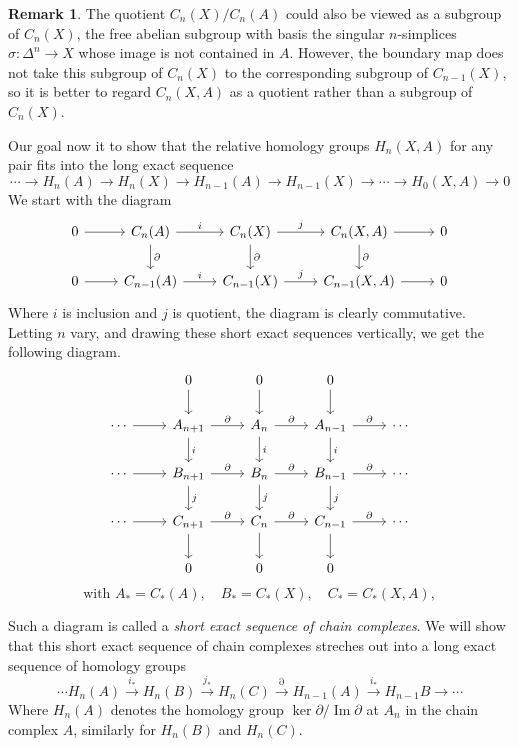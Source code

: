 \documentclass[11pt,a4paper]{article}
\theoremstyle{definition}
\newtheorem{remark}[definition]{Remark}
\theoremstyle{plain}
\theoremstyle{remark}
\begin{document}
\begin{remark}
The quotient $C_n(X) / C_n(A)$ could also be viewed as a subgroup of $C_n(X)$, the free abelian subgroup with 
basis the singular $n$-simplices $\sigma \colon \Delta^n \to X$ whose image is not contained in $A$. 
However, the boundary map does not take this subgroup of $C_n(X)$ to the corresponding subgroup of $C_{n-1} (X)$, so it 
is better to regard $C_n (X, A)$ as a quotient rather than a subgroup of $C_n(X)$. 

Our goal now it to show that the relative homology groups $H_n(X,A)$ for any pair fits into the long exact sequence 
$$\cdots \to H_n (A) \to H_n(X) \to H_{n-1} (A) \to H_{n-1} (X) \to \cdots \to H_0(X,A) \to 0$$
We start with the diagram 
\[
\begin{tikzcd}
0 \arrow[r] &
C_n(A) \arrow[r,"i"] \arrow[d,"\partial"] &
C_n(X) \arrow[r,"j"] \arrow[d,"\partial"] &
C_n(X,A) \arrow[r] \arrow[d,"\partial"] &
0 \\
0 \arrow[r] &
C_{n-1}(A) \arrow[r,"i"] &
C_{n-1}(X) \arrow[r,"j"] &
C_{n-1}(X,A) \arrow[r] &
0
\end{tikzcd}
\]
Where $i$ is inclusion and $j$ is quotient, the diagram is clearly commutative. 
Letting $n$ vary, and drawing these short exact sequences vertically, we get the following diagram.
\[
\begin{tikzcd}
& 0 \arrow[d] & 0 \arrow[d] & 0 \arrow[d] & \\
\cdots \arrow[r] &
A_{n+1} \arrow[r,"\partial"] \arrow[d,"i"] &
A_n \arrow[r,"\partial"] \arrow[d,"i"] &
A_{n-1} \arrow[r,"\partial"] \arrow[d,"i"] &
\cdots \\
\cdots \arrow[r] &
B_{n+1} \arrow[r,"\partial"] \arrow[d,"j"] &
B_n \arrow[r,"\partial"] \arrow[d,"j"] &
B_{n-1} \arrow[r,"\partial"] \arrow[d,"j"] &
\cdots \\
\cdots \arrow[r] &
C_{n+1} \arrow[r,"\partial"] \arrow[d] &
C_n \arrow[r,"\partial"] \arrow[d] &
C_{n-1} \arrow[r,"\partial"] \arrow[d] &
\cdots \\
& 0 & 0 & 0 &
\end{tikzcd}
\]
\[
\text{with } A_*=C_*(A),\quad B_*=C_*(X),\quad C_*=C_*(X,A),
\]

Such a diagram is called a \emph{short exact sequence of chain complexes}. We will show that this 
short exact sequence of chain complexes streches out into a long exact sequence of homology groups 
$$\cdots H_n(A) \xrightarrow{i_*} H_n(B) \xrightarrow{j_*} H_n (C) \xrightarrow{\partial} H_{n-1} (A) \xrightarrow{i_*} H_{n-1} B \rightarrow \cdots$$
Where $H_n(A)$ denotes the homology group $\ker \partial / \operatorname{Im} \partial$ at $A_n$ in the chain complex $A$, 
similarly for $H_n(B)$ and $H_n(C)$. 


\end{remark}
\end{document}

